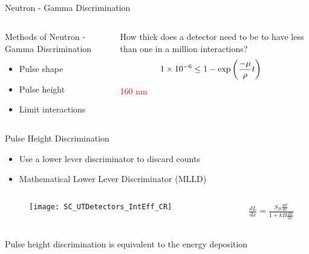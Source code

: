 \subsection*{}
\begin{frame}{Neutron - Gamma Discrimination}
  \begin{columns}[onlytextwidth]
    \begin{column}{0.45\textwidth}
    \large
    Methods of Neutron - Gamma Discrimination
    \normalsize
    \begin{itemize}
      \item Pulse shape 
      \item Pulse height
      \item Limit interactions
    \end{itemize}
    \end{column}
    \begin{column}{0.45\textwidth}
      How thick does a detector need to be to have less than one in a million interactions?
      \vspace{1cm}
      \begin{align*}
        \num{1E-6} &\le 1-\exp\left ( \frac{-\mu}{\rho}t \right )  
      \end{align*}
      \pause
      \huge
      \textcolor{red}{160 nm}
    \end{column}
  \end{columns}
\end{frame}
\begin{frame}[t]{Pulse Height Discrimination}
  \begin{itemize}
    \item Use a lower lever discriminator to discard counts
    \item Mathematical Lower Lever Discriminator (MLLD)
  \end{itemize}
  \begin{columns}[onlytextwidth]
    \begin{column}{0.7\textwidth}
      \begin{figure}
          \vspace*{-1cm}
          \texttt{[image: SC\_UTDetectors\_IntEff\_CR]}
      \end{figure}
    \end{column}
    \begin{column}{0.25\textwidth}
  \begin{align*}
    \frac{dL}{dx} = \frac{S_B\frac{dE}{dx}}{1+kB\frac{dE}{dx}}
  \end{align*}
    \end{column}
  \end{columns}
  Pulse height discrimination is equivalent to the energy deposition
\end{frame}
